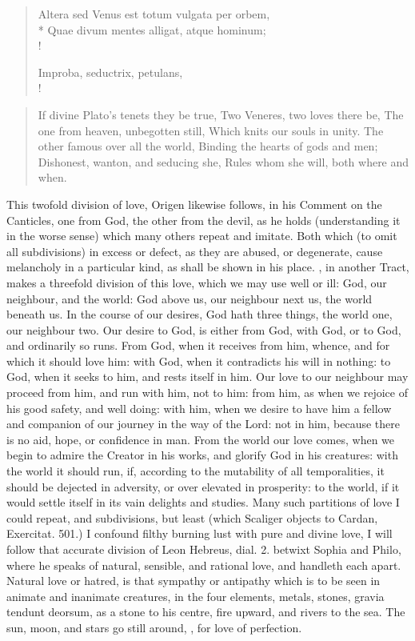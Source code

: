 {\begin{latin}
\begin{verse}
Altera sed Venus est totum vulgata per orbem,\\*
Quae divum mentes alligat, atque hominum;\\!

Improba, seductrix, petulans, \etc{}\\!
\end{verse}%
\end{latin}
\translationrule%
\begin{verse}%
If divine Plato's tenets they be true,
Two Veneres, two loves there be,
The one from heaven, unbegotten still,
Which knits our souls in unity.
The other famous over all the world,
Binding the hearts of gods and men;
Dishonest, wanton, and seducing she,
Rules whom she will, both where and when.
\end{verse}%

This twofold division of love, Origen likewise follows, in his Comment
on the Canticles, one from God, the other from the devil, as he holds
(understanding it in the worse sense) which many others repeat and
imitate. Both which (to omit all subdivisions) in excess or defect, as
they are abused, or degenerate, cause melancholy in a particular kind,
as shall be shown in his place. \Austin{}, in another Tract, makes a
threefold division of this love, which we may use well or ill:
God, our neighbour, and the world: God above us, our neighbour
next us, the world beneath us. In the course of our desires, God hath
three things, the world one, our neighbour two. Our desire to God, is
either from God, with God, or to God, and ordinarily so runs. From God,
when it receives from him, whence, and for which it should love him:
with God, when it contradicts his will in nothing: to God, when it
seeks to him, and rests itself in him. Our love to our neighbour may
proceed from him, and run with him, not to him: from him, as when we
rejoice of his good safety, and well doing: with him, when we desire to
have him a fellow and companion of our journey in the way of the Lord:
not in him, because there is no aid, hope, or confidence in man. From
the world our love comes, when we begin to admire the Creator in his
works, and glorify God in his creatures: with the world it should run,
if, according to the mutability of all temporalities, it should be
dejected in adversity, or over elevated in prosperity: to the world, if
it would settle itself in its vain delights and studies. Many such
partitions of love I could repeat, and subdivisions, but least (which
Scaliger objects to Cardan, Exercitat. 501.) I confound filthy
burning lust with pure and divine love, I will follow that accurate
division of Leon Hebreus, dial. 2. betwixt Sophia and Philo, where he
speaks of natural, sensible, and rational love, and handleth each
apart. Natural love or hatred, is that sympathy or antipathy which is
to be seen in animate and inanimate creatures, in the four elements,
metals, stones, gravia tendunt deorsum, as a stone to his centre, fire
upward, and rivers to the sea. The sun, moon, and stars go still
around, , for love of perfection.

}
